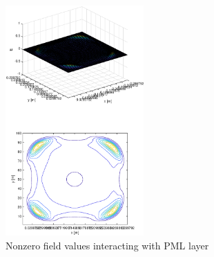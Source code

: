 \documentclass{article}
\begin{document}
\begin{figure}
  \centering
  \includegraphics[width=200]{GaussianBoundary}
  \caption{Nonzero field values interacting with PML layer}\label{fig:GaussianBoundary}
\end{figure}
\end{document}
